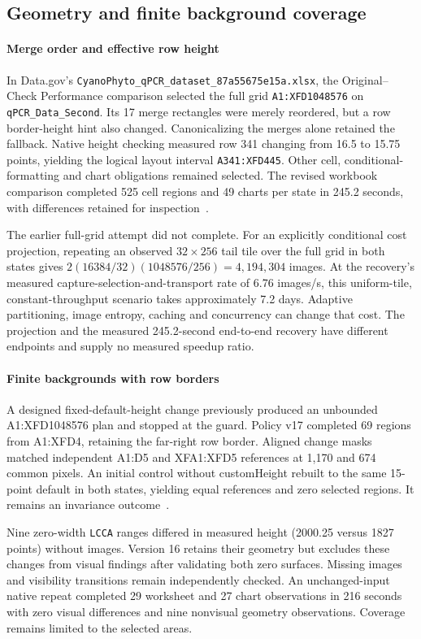 \subsection{Geometry and finite background coverage}
\paragraph{Merge order and effective row height}
In Data.gov's \texttt{CyanoPhyto\_qPCR\_dataset\_87a55675e15a.xlsx}, the
Original--Check Performance comparison selected the full grid
\texttt{A1:XFD1048576} on \texttt{qPCR\_Data\_Second}. Its 17 merge rectangles
were merely reordered, but a row border-height hint also changed. Canonicalizing
the merges alone retained the fallback. Native height checking measured row
341 changing from 16.5 to 15.75 points, yielding the logical layout interval
\texttt{A341:XFD445}. Other cell, conditional-formatting and chart obligations
remained selected. The revised workbook comparison completed 525 cell regions
and 49 charts per state in 245.2 seconds, with differences retained for
inspection~\cite{cyanophytofallback}.

The earlier full-grid attempt did not complete. For an explicitly conditional
cost projection, repeating an observed $32\times256$ tail tile over the full
grid in both states gives $2(16384/32)(1048576/256)=4{,}194{,}304$ images.
At the recovery's measured capture-selection-and-transport rate of 6.76 images/s,
this uniform-tile, constant-throughput scenario takes approximately 7.2 days.
Adaptive partitioning, image entropy, caching and concurrency can change that
cost. The projection and the measured 245.2-second end-to-end recovery have
different endpoints and supply no measured speedup ratio.

\paragraph{Finite backgrounds with row borders}
A designed fixed-default-height change previously produced an unbounded
A1:XFD1048576 plan and stopped at the guard. Policy v17 completed 69 regions
from A1:XFD4, retaining the far-right row border. Aligned change masks matched
independent A1:D5 and XFA1:XFD5 references at 1,170 and 674 common pixels.
An initial control without customHeight rebuilt to the same 15-point default
in both states, yielding equal references and zero selected regions. It remains
an invariance outcome~\cite{rowborderbackground}.

Nine zero-width \texttt{LCCA} ranges differed in measured height (2000.25 versus
1827 points) without images. Version 16 retains their geometry but excludes
these changes from visual findings after validating both zero surfaces.
Missing images and visibility transitions remain independently checked.
An unchanged-input native repeat completed 29 worksheet and 27 chart
observations in 216 seconds with zero visual differences and nine nonvisual
geometry observations. Coverage remains limited to the selected areas.

